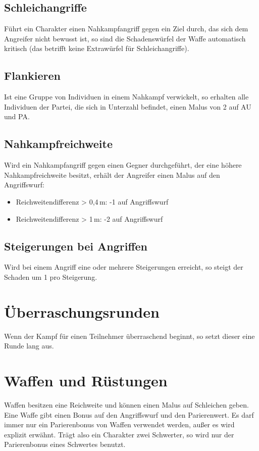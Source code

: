 \documentclass[../../Heldenanleitung2]{subfiles}
\begin{document}
\subsection{Schleichangriffe}
Führt ein Charakter einen Nahkampfangriff gegen ein Ziel durch, das sich dem Angreifer nicht bewusst ist, so sind die Schadenswürfel der Waffe automatisch kritisch (das betrifft keine Extrawürfel für Schleichangriffe).

\subsection{Flankieren}
Ist eine Gruppe von Individuen in einem Nahkampf verwickelt, so erhalten alle Individuen der Partei, die sich in Unterzahl befindet, einen Malus von 2 auf AU und PA.

\subsection{Nahkampfreichweite}
Wird ein Nahkampfangriff gegen einen Gegner durchgeführt, der eine höhere Nahkampfreichweite besitzt, erhält der Angreifer einen Malus auf den Angriffswurf:
\begin{itemize}
	\item Reichweitendifferenz > 0,4\,m: -1 auf Angriffswurf
	\item Reichweitendifferenz > 1\,m: -2 auf Angriffswurf
\end{itemize}

\subsection{Steigerungen bei Angriffen}
Wird bei einem Angriff eine oder mehrere Steigerungen erreicht, so steigt der Schaden um 1 pro Steigerung.

\section{Überraschungsrunden}
Wenn der Kampf für einen Teilnehmer überraschend beginnt, so setzt dieser eine Runde lang aus.

\section{Waffen und Rüstungen}
Waffen besitzen eine Reichweite und können einen Malus auf Schleichen geben. Eine Waffe gibt einen Bonus auf den Angriffswurf und den Parierenwert. Es darf immer nur ein Parierenbonus von Waffen verwendet werden, außer es wird explizit erwähnt. Trägt also ein Charakter zwei Schwerter, so wird nur der Parierenbonus eines Schwertes benutzt. 
\end{document}
